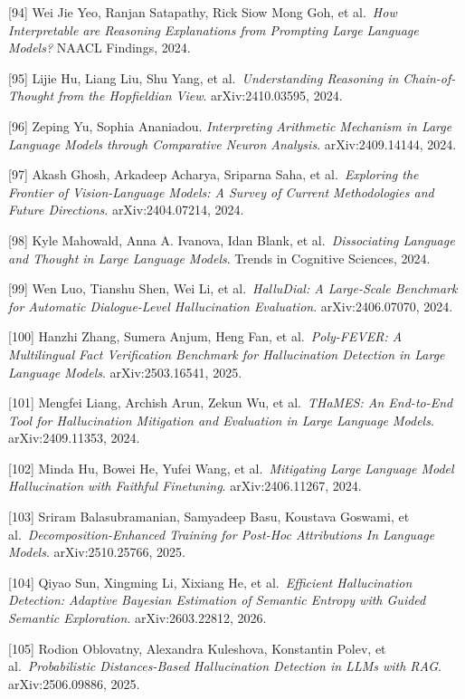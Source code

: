 {[}94{]} Wei Jie Yeo, Ranjan Satapathy, Rick Siow Mong Goh, et al.~\emph{How Interpretable are Reasoning Explanations from Prompting Large Language Models?} NAACL Findings, 2024.

{[}95{]} Lijie Hu, Liang Liu, Shu Yang, et al.~\emph{Understanding Reasoning in Chain-of-Thought from the Hopfieldian View}. arXiv:2410.03595, 2024.

{[}96{]} Zeping Yu, Sophia Ananiadou. \emph{Interpreting Arithmetic Mechanism in Large Language Models through Comparative Neuron Analysis}. arXiv:2409.14144, 2024.

{[}97{]} Akash Ghosh, Arkadeep Acharya, Sriparna Saha, et al.~\emph{Exploring the Frontier of Vision-Language Models: A Survey of Current Methodologies and Future Directions}. arXiv:2404.07214, 2024.

{[}98{]} Kyle Mahowald, Anna A. Ivanova, Idan Blank, et al.~\emph{Dissociating Language and Thought in Large Language Models}. Trends in Cognitive Sciences, 2024.

{[}99{]} Wen Luo, Tianshu Shen, Wei Li, et al.~\emph{HalluDial: A Large-Scale Benchmark for Automatic Dialogue-Level Hallucination Evaluation}. arXiv:2406.07070, 2024.

{[}100{]} Hanzhi Zhang, Sumera Anjum, Heng Fan, et al.~\emph{Poly-FEVER: A Multilingual Fact Verification Benchmark for Hallucination Detection in Large Language Models}. arXiv:2503.16541, 2025.

{[}101{]} Mengfei Liang, Archish Arun, Zekun Wu, et al.~\emph{THaMES: An End-to-End Tool for Hallucination Mitigation and Evaluation in Large Language Models}. arXiv:2409.11353, 2024.

{[}102{]} Minda Hu, Bowei He, Yufei Wang, et al.~\emph{Mitigating Large Language Model Hallucination with Faithful Finetuning}. arXiv:2406.11267, 2024.

{[}103{]} Sriram Balasubramanian, Samyadeep Basu, Koustava Goswami, et al.~\emph{Decomposition-Enhanced Training for Post-Hoc Attributions In Language Models}. arXiv:2510.25766, 2025.

{[}104{]} Qiyao Sun, Xingming Li, Xixiang He, et al.~\emph{Efficient Hallucination Detection: Adaptive Bayesian Estimation of Semantic Entropy with Guided Semantic Exploration}. arXiv:2603.22812, 2026.

{[}105{]} Rodion Oblovatny, Alexandra Kuleshova, Konstantin Polev, et al.~\emph{Probabilistic Distances-Based Hallucination Detection in LLMs with RAG}. arXiv:2506.09886, 2025.

